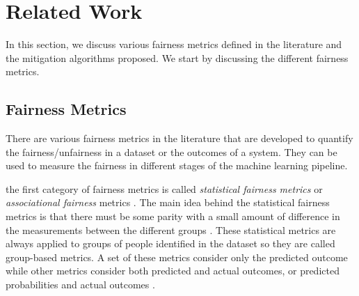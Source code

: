 \section{Related Work} \label{sec:related}

In this section, we discuss various fairness metrics defined in the literature and the mitigation algorithms proposed. We start by discussing the different fairness metrics.

\subsection{Fairness Metrics}
There are various fairness metrics in the literature that are developed to quantify the fairness/unfairness in a dataset or the outcomes of a system. They can be used to measure the fairness in different stages of the machine learning pipeline. 

 the first category of fairness metrics is called \emph{statistical fairness metrics} or \emph{associational fairness} metrics \cite{salimi2019interventional}.  The main idea behind the statistical fairness metrics is that there must be some parity with a small amount of difference in the measurements between the different groups \cite{chouldechova2018frontiers}. These statistical metrics are always applied to groups of people identified in the dataset so they are called group-based metrics. A set of these metrics consider only the predicted outcome while other metrics consider both predicted and actual outcomes, or predicted probabilities and actual outcomes \cite{verma2018fairness_explained}.


